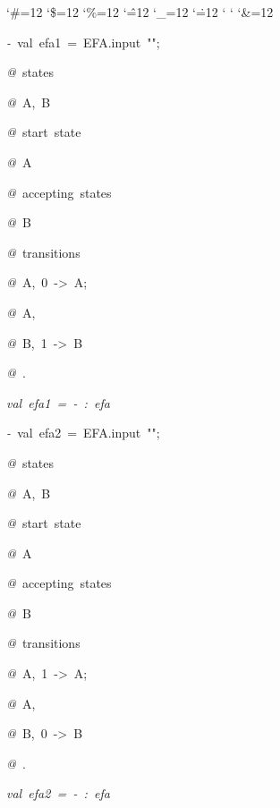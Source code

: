 \begin{list}{}
{\setlength{\leftmargin}{\leftmargini}
\setlength{\rightmargin}{0cm}
\setlength{\itemindent}{0cm}
\setlength{\listparindent}{0cm}
\setlength{\itemsep}{0cm}
\setlength{\parsep}{0cm}
\setlength{\labelsep}{0cm}
\setlength{\labelwidth}{0cm}
\catcode`\#=12
\catcode`\$=12
\catcode`\%=12
\catcode`\^=12
\catcode`\_=12
\catcode`\.=12
\catcode`
\catcode`
\catcode`\&=12
\ttfamily}
\small
\item[]\textsl{-\ }val\ efa1\ =\ EFA.input\ "";
\item[]\textsl{@\ }states
\item[]\textsl{@\ }A,\ B
\item[]\textsl{@\ }start\ state
\item[]\textsl{@\ }A
\item[]\textsl{@\ }accepting\ states
\item[]\textsl{@\ }B
\item[]\textsl{@\ }transitions
\item[]\textsl{@\ }A,\ 0\ ->\ A;
\item[]\textsl{@\ }A,\ %
\item[]\textsl{@\ }B,\ 1\ ->\ B
\item[]\textsl{@\ }.
\item[]\textsl{val\ efa1\ =\ -\ :\ efa}
\item[]\textsl{-\ }val\ efa2\ =\ EFA.input\ "";
\item[]\textsl{@\ }states
\item[]\textsl{@\ }A,\ B
\item[]\textsl{@\ }start\ state
\item[]\textsl{@\ }A
\item[]\textsl{@\ }accepting\ states
\item[]\textsl{@\ }B
\item[]\textsl{@\ }transitions
\item[]\textsl{@\ }A,\ 1\ ->\ A;
\item[]\textsl{@\ }A,\ %
\item[]\textsl{@\ }B,\ 0\ ->\ B
\item[]\textsl{@\ }.
\item[]\textsl{val\ efa2\ =\ -\ :\ efa}
\end{list}
